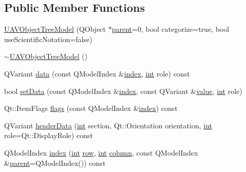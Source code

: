 \subsection*{Public Member Functions}
\begin{DoxyCompactItemize}
\item 
\hyperlink{group___u_a_v_object_browser_plugin_ga7c48c4fa7c5b464e0127d929f8610964}{U\-A\-V\-Object\-Tree\-Model} (Q\-Object $\ast$\hyperlink{group___u_a_v_object_browser_plugin_ga8d23a2cd6d6b785179ebd12426f142e3}{parent}=0, bool categorize=true, bool use\-Scientific\-Notation=false)
\item 
\hyperlink{group___u_a_v_object_browser_plugin_ga162709965b0a670c87305d09bf3d5e76}{$\sim$\-U\-A\-V\-Object\-Tree\-Model} ()
\item 
Q\-Variant \hyperlink{group___u_a_v_object_browser_plugin_ga7e2af1d5c89b55437fb74df890b24a53}{data} (const Q\-Model\-Index \&\hyperlink{glext_8h_ab47dd9958bcadea08866b42bf358e95e}{index}, \hyperlink{ioapi_8h_a787fa3cf048117ba7123753c1e74fcd6}{int} role) const 
\item 
bool \hyperlink{group___u_a_v_object_browser_plugin_ga3327e2ff6b418ae404a06d7c990fbc50}{set\-Data} (const Q\-Model\-Index \&\hyperlink{glext_8h_ab47dd9958bcadea08866b42bf358e95e}{index}, const Q\-Variant \&\hyperlink{glext_8h_aa0e2e9cea7f208d28acda0480144beb0}{value}, \hyperlink{ioapi_8h_a787fa3cf048117ba7123753c1e74fcd6}{int} role)
\item 
Qt\-::\-Item\-Flags \hyperlink{group___u_a_v_object_browser_plugin_ga16ae36c54433edd7b07439edc1264b59}{flags} (const Q\-Model\-Index \&\hyperlink{glext_8h_ab47dd9958bcadea08866b42bf358e95e}{index}) const 
\item 
Q\-Variant \hyperlink{group___u_a_v_object_browser_plugin_gaa19ce01eb026443086adfe5063bbc233}{header\-Data} (\hyperlink{ioapi_8h_a787fa3cf048117ba7123753c1e74fcd6}{int} section, Qt\-::\-Orientation orientation, \hyperlink{ioapi_8h_a787fa3cf048117ba7123753c1e74fcd6}{int} role=Qt\-::\-Display\-Role) const 
\item 
Q\-Model\-Index \hyperlink{group___u_a_v_object_browser_plugin_ga9b9e52145b78d333effe586a41478701}{index} (\hyperlink{ioapi_8h_a787fa3cf048117ba7123753c1e74fcd6}{int} \hyperlink{glext_8h_a11b277b422822f784ee248b43eee3e1e}{row}, \hyperlink{ioapi_8h_a787fa3cf048117ba7123753c1e74fcd6}{int} \hyperlink{glext_8h_a3b58c39b1b7ca6f4012b27e84de3bdb3}{column}, const Q\-Model\-Index \&\hyperlink{group___u_a_v_object_browser_plugin_ga8d23a2cd6d6b785179ebd12426f142e3}{parent}=Q\-Model\-Index()) const 

\end{DoxyCompactItemize}
